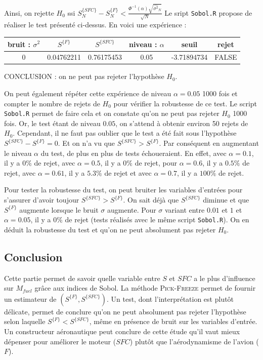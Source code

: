 \documentclass{article}
\begin{document}
Ainsi, on rejette $H_0$ ssi $S^{\{SFC\}}_N - S^{\{F\}}_N < \frac{\Phi^{-1}(\alpha)\sqrt{\widehat{\sigma^{2}}_N}}{\sqrt{N}}$
\medbreak
Le sript \texttt{Sobol.R} propose de réaliser le test présenté ci-dessus. 
En voici une expérience :
\begin{center}
\begin{tabular}{ | c | c |  c | c |c|c|}
\hline			
   bruit : $\sigma ^2$ & $S^{\{F\}}$ & $S^{\{SFC\}}$ & niveau : $\alpha$ & seuil & rejet\\\hline
   0 & 0.04762211 & 0.76175453 & 0.05 & -3.71894734 &  FALSE\\
\hline
\end{tabular}
\end{center}

CONCLUSION : on ne peut pas rejeter l'hypothèse $H_0$.

\medbreak
On peut également répéter cette expérience de niveau $\alpha = 0.05$ 1000 fois et compter le nombre de rejets de $H_0$ pour vérifier la robustesse de ce test. Le script \texttt{Sobol.R} permet de faire cela et on constate qu'on ne peut pas rejeter $H_0$ 1000 fois. Or, le test étant de niveau $0.05$, on s'attend à obtenir environ 50 rejets de $H_0$. Cependant, il ne faut pas oublier que le test a été fait sous l'hypothèse $S^{\{SFC\}} - S^{\{F\}} = 0$. Et on n'a vu que $S^{\{SFC\}} > S^{\{F\}}$. Par conséquent en augmentant le niveau $\alpha$ du test, de plus en plus de tests échoueraient. En effet, avec $\alpha=0.1$, il y a $0\%$ de rejet, avec $\alpha=0.5$, il y a $0\%$ de rejet, pour $\alpha=0.6$, il y a $0.5\%$ de rejet, avec $\alpha=0.61$, il y a $5.3\%$ de rejet et avec $\alpha=0.7$, il y a $100\%$ de rejet. 

Pour tester la robustesse du test, on peut bruiter les variables d'entrées pour s'assurer d'avoir toujour $S^{\{SFC\}} > S^{\{F\}}$. On sait déjà que $S^{\{SFC\}}$ diminue et que $S^{\{F\}}$ augmente lorsque le bruit $\sigma$ augmente. Pour $\sigma$ variant entre $0.01$ et $1$ et $\alpha = 0.05$, il y a $0\%$ de rejet (tests réalisés avec le même script \texttt{Sobol.R}). On en déduit la robustesse du test et qu'on ne peut absolument pas rejeter $H_0$.
\subsection{Conclusion}
Cette partie permet de savoir quelle variable entre $S$ et $SFC$ a le plus d'influence sur $M_{fuel}$ grâce aux indices de Sobol. La méthode \textsc{Pick-Freeze} permet de fournir un estimateur de $(S^{\{F\}}, S^{\{SFC\}})$. Un test, dont l'interprétation est plutôt délicate, permet de conclure qu'on ne peut absolument pas rejeter l'hypothèse selon laquelle $S^{\{F\}} < S^{\{SFC\}}$, même en présence de bruit sur les variables d'entrée. Un constructeur aéronautique peut conclure de cette étude qu'il vaut mieux dépenser pour améliorer le moteur ($SFC$) plutôt que l'aérodynamisme de l'avion ($F$).
\end{document}
